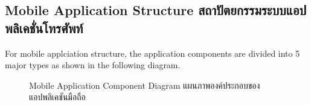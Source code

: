 \subsection{\ifenglish Mobile Application Structure \else สถาปัตยกรรมระบบแอปพลิเคชั่นโทรศัพท์ \fi}
For mobile applciation structure, the application components are divided into 5 major types as shown in the following diagram.

\begin{figure}[ht]
    \begin{center}
    \end{center}
    \newcommand{\MobileAppComponentDiagram}{\ifenglish Mobile Application Component Diagram \else แผนภาพองค์ประกอบของแอปพลิเคชันมือถือ \fi}
    \caption[\MobileAppComponentDiagram]{\MobileAppComponentDiagram}
    \label{fig:mobile app component diagram}
\end{figure}

